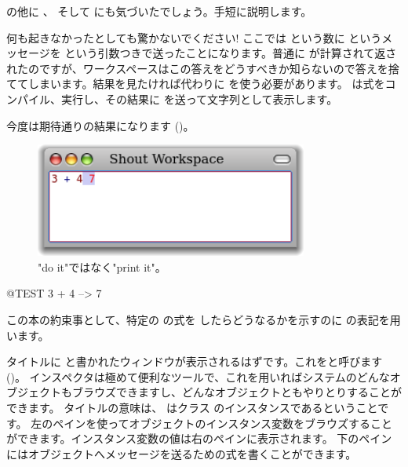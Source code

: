 \documentclass[a4paper,10pt,twoside]{book}
\begin{document}
 の他に 、 そして  にも気づいたでしょう。手短に説明します。


何も起きなかったとしても驚かないでください! ここでは  という数に \ct{+} というメッセージを  という引数つきで送ったことになります。普通に  が計算されて返されたのですが、ワークスペースはこの答えをどうすべきか知らないので答えを捨ててしまいます。結果を見たければ代わりに  を使う必要があります。 は式をコンパイル、実行し、その結果に  を送って文字列として表示します。

今度は期待通りの結果になります ()。

\begin{figure}[htb]
\centerline {\includegraphics[width=0.8\textwidth]{PrintIt}}
\caption{"do it"ではなく"print it"。}
\end{figure}

\begin{code}{@TEST}
3 + 4 --> 7
\end{code}
\noindent
この本の約束事として、特定の \pharo の式を  したらどうなるかを示すのに \ct{-->} の表記を用います。

\noindent
タイトルに  と書かれたウィンドウが表示されるはずです。これをと呼びます ()。
インスペクタは極めて便利なツールで、これを用いればシステムのどんなオブジェクトもブラウズできますし、どんなオブジェクトともやりとりすることができます。
タイトルの意味は、 はクラス  のインスタンスであるということです。
左のペインを使ってオブジェクトのインスタンス変数をブラウズすることができます。インスタンス変数の値は右のペインに表示されます。
下のペインにはオブジェクトへメッセージを送るための式を書くことができます。
\end{document}
